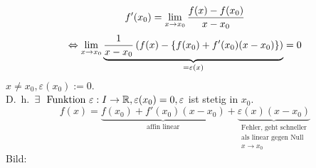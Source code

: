 \documentclass[../ana1.tex]{subfiles}
\begin{document}
\begin{bem}
    \[ f'(x_0) = \lim\limits_{x\rightarrow x_0} \frac{f(x) - f(x_0)}{ x - x_0 } \]
    \[ \Leftrightarrow \lim\limits_{x\rightarrow x_0} \underbrace{ \frac{1}{x - x_0} \left(
        f(x) - \{ f(x_0) + f'(x_0)(x-x_0) \} \right) 
    }_{=\varepsilon(x)} = 0 \]
    \( x \neq x_0, \varepsilon(x_0) := 0 \).\\
    D.\ h.\  \( \exists \, \text{ Funktion } 
    \varepsilon : I \rightarrow \R, \varepsilon (x_0) = 0, \varepsilon \) 
    ist stetig in \(x_0\).
    \[ f(x) = \underbrace{f(x_0) + f'(x_0)(x - x_0)}_{
        \text{affin linear}
    } + \underbrace{\varepsilon(x)(x - x_0)}_{\substack{
        \text{Fehler, geht schneller}\\\text{als linear gegen Null}\\
        x \rightarrow x_0}} \]
    Bild:
    \begin{center}
    \end{center}
\end{bem}
\end{document}
